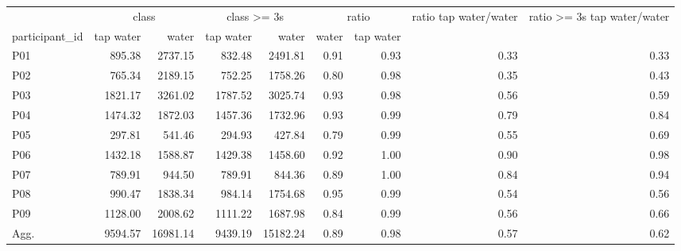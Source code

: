 \begin{tabular}{lrrrrrrrr}
\toprule
 & \multicolumn{2}{c}{class} & \multicolumn{2}{c}{class >= 3s} & \multicolumn{2}{c}{ratio} & ratio tap water/water & ratio >= 3s tap water/water \\
participant_id & tap water & water & tap water & water & water & tap water &  &  \\
\midrule
P01 & 895.38 & 2737.15 & 832.48 & 2491.81 & 0.91 & 0.93 & 0.33 & 0.33 \\
P02 & 765.34 & 2189.15 & 752.25 & 1758.26 & 0.80 & 0.98 & 0.35 & 0.43 \\
P03 & 1821.17 & 3261.02 & 1787.52 & 3025.74 & 0.93 & 0.98 & 0.56 & 0.59 \\
P04 & 1474.32 & 1872.03 & 1457.36 & 1732.96 & 0.93 & 0.99 & 0.79 & 0.84 \\
P05 & 297.81 & 541.46 & 294.93 & 427.84 & 0.79 & 0.99 & 0.55 & 0.69 \\
P06 & 1432.18 & 1588.87 & 1429.38 & 1458.60 & 0.92 & 1.00 & 0.90 & 0.98 \\
P07 & 789.91 & 944.50 & 789.91 & 844.36 & 0.89 & 1.00 & 0.84 & 0.94 \\
P08 & 990.47 & 1838.34 & 984.14 & 1754.68 & 0.95 & 0.99 & 0.54 & 0.56 \\
P09 & 1128.00 & 2008.62 & 1111.22 & 1687.98 & 0.84 & 0.99 & 0.56 & 0.66 \\
Agg. & 9594.57 & 16981.14 & 9439.19 & 15182.24 & 0.89 & 0.98 & 0.57 & 0.62 \\
\bottomrule
\end{tabular}
